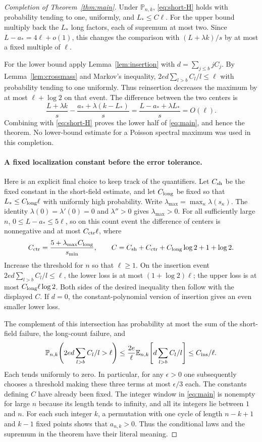 \documentclass[11pt]{article}
\theoremstyle{definition}\newtheorem{definition}[theorem]{Definition}
\theoremstyle{remark}\newtheorem{remark}[theorem]{Remark}
\newcommand{\E}{\mathbb E}\newcommand{\Pp}{\mathbb P}
\numberwithin{equation}{section}\allowdisplaybreaks
\begin{document}
\begin{proof}[Completion of Theorem~\ref{thm:main}]
Under $\Pp_{n,k}$, \eqref{eq:short-H} holds with probability tending to
one, uniformly, and $L_*\le C\ell$. For the upper bound multiply back
the $L_*$ long factors, each of supremum at most two. Since
$L-a_*=4\ell+o(1)$, this changes the comparison with
$(L+\lambda k)/s$ by at most a fixed multiple of $\ell$.

For the lower bound apply Lemma~\ref{lem:insertion} with
$d=\sum_{j\le b}jC_j$. By Lemma~\ref{lem:crossmass} and Markov's
inequality, $2ed\sum_{l>b}C_l/l\le\ell$ with probability tending to
one uniformly. Thus reinsertion decreases the maximum by at most
$\ell+\log2$ on that event. The difference between the two centers is
\[
 \frac{L+\lambda k}{s}-\frac{a_*+\lambda(k-L_*)}{s}
   =\frac{L-a_*+\lambda L_*}{s}=O(\ell).
\]
Combining with \eqref{eq:short-H} proves the lower half of
\eqref{eq:main}, and hence the theorem. No lower-bound estimate for a
Poisson spectral maximum was used in this completion.

\paragraph{A fixed localization constant before the error tolerance.}
Here is an explicit final choice to keep track of the
quantifiers. Let $C_{\rm sh}$ be the fixed constant in
the short-field estimate, and let $C_{\rm long}$ be
fixed so that $L_*\le C_{\rm long}\ell$ with uniformly
high probability. Write
$\lambda_{\max}=\max_{\kappa}\lambda(s_\kappa)$.
The identity $\lambda(0)=\lambda'(0)=0$ and
$\lambda''>0$ gives $\lambda_{\max}>0$.
For all sufficiently large $n$,
$0\le L-a_*\le5\ell$, so on this count event the
difference of centers is nonnegative and at most
$C_{\rm ctr}\ell$, where
\[
 C_{\rm ctr}=\frac{5+\lambda_{\max}C_{\rm long}}{s_{\min}},
 \qquad
 C=C_{\rm sh}+C_{\rm ctr}
           +C_{\rm long}\log2+1+\log2.
\]
Increase the threshold for $n$ so that $\ell\ge1$.
On the insertion event
$2ed\sum_{l>b}C_l/l\le\ell$, the lower loss is
at most $(1+\log2)\ell$; the upper loss is at most
$C_{\rm long}\ell\log2$. Both sides of the desired
inequality then follow with the displayed $C$.
If $d=0$, the constant-polynomial version of insertion
gives an even smaller lower loss.

The complement of this intersection has probability
at most the sum of the short-field failure, the
long-count failure, and
\[
 \Pp_{n,k}\!\left(2ed\sum_{l>b}C_l/l>\ell\right)
 \le\frac{2e}{\ell}
       \E_{n,k}\!\left[d\sum_{l>b}C_l/l\right]
 \le C_{\rm ins}/\ell.
\]
Each tends uniformly to zero. In particular, for any
$\epsilon>0$ one subsequently chooses a threshold
making these three terms at most $\epsilon/3$ each.
The constants defining $C$ have already been fixed.
The integer window in \eqref{eq:main} is nonempty
for large $n$ because its length tends to infinity,
and all its integers lie between $1$ and $n$.
For each such integer $k$, a permutation with one
cycle of length $n-k+1$ and $k-1$ fixed points shows
that $a_{n,k}>0$. Thus the conditional laws and the
supremum in the theorem have their literal meaning.


\end{proof}
\end{document}
